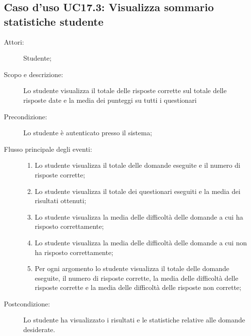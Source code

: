 \subsection{Caso d'uso UC17.3: Visualizza sommario statistiche studente}\begin{description}
\item[Attori:] Studente;
\item[Scopo e descrizione:] Lo studente visualizza il totale delle risposte corrette sul totale delle risposte date e la media dei punteggi su tutti i questionari
      \item[Precondizione:] Lo studente è autenticato presso il sistema;

        \item[Flusso principale degli eventi:] \begin{enumerate}
          \item Lo studente visualizza il totale delle domande eseguite e il numero di risposte corrette;
          \item Lo studente visualizza il totale dei questionari eseguiti e la media dei risultati ottenuti;
          \item Lo studente visualizza la media delle difficoltà delle domande a cui ha risposto correttamente;
          \item Lo studente visualizza la media delle difficoltà delle domande a cui non ha risposto correttamente;
          \item Per ogni argomento lo studente visualizza il totale delle domande eseguite, il numero di risposte corrette, la media delle difficoltà delle risposte corrette e la media delle difficoltà delle risposte non corrette;

      \end{enumerate}
    \item[Postcondizione:] Lo studente ha visualizzato i risultati e le statistiche relative alle domande desiderate.
  \end{description}
\hypertarget{UC18}{}
